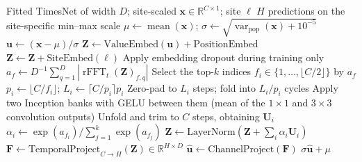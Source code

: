 \begin{algorithm}[H]
\caption{Direct forward pass of the compact TimesNet}
\label{alg:timesnet-direct}
\footnotesize
\begin{algorithmic}[1]
\Require Fitted TimesNet of width $D$; site-scaled $\mathbf x\in\mathbb R^{C\times1}$; site $\ell$
\Ensure $H$ predictions on the site-specific min--max scale
  \State $\mu\gets\operatorname{mean}(\mathbf x)$;
  $\sigma\gets\sqrt{\operatorname{var}_{\mathrm{pop}}(\mathbf x)+10^{-5}}$
  \State $\mathbf u\gets(\mathbf x-\mu)/\sigma$
  \State $\mathbf Z\gets\mathrm{ValueEmbed}(\mathbf u)+\mathrm{PositionEmbed}$
  \State $\mathbf Z\gets\mathbf Z+\mathrm{SiteEmbed}(\ell)$
  \State Apply embedding dropout during training only
    \State $a_f\gets D^{-1}\sum_{q=1}^{D}|\operatorname{rFFT}_t(\mathbf Z)_{f,q}|$
    \State Select the top-$k$ indices $f_i\in\{1,\ldots,\lfloor C/2\rfloor\}$ by $a_f$
      \State $p_i\gets\lfloor C/f_i\rfloor$; $L_i\gets\lceil C/p_i\rceil p_i$
      \State Zero-pad to $L_i$ steps; fold into $L_i/p_i$ cycles
      \State Apply two Inception banks with GELU between them
      \Statex \hspace{\algorithmicindent}(mean of the $1\times1$ and $3\times3$ convolution outputs)
      \State Unfold and trim to $C$ steps, obtaining $\mathbf U_i$
    \EndFor
    \State $\alpha_i\gets\exp(a_{f_i})/\sum_{j=1}^{k}\exp(a_{f_j})$
    \State $\mathbf Z\gets\mathrm{LayerNorm}(\mathbf Z+\sum_i\alpha_i\mathbf U_i)$
  \EndFor
  \State $\mathbf F\gets\mathrm{TemporalProject}_{C\to H}(\mathbf Z)\in\mathbb R^{H\times D}$
  \State $\widehat{\mathbf u}\gets\mathrm{ChannelProject}(\mathbf F)$
  \State \Return $\sigma\widehat{\mathbf u}+\mu$
\end{algorithmic}
\end{algorithm}
